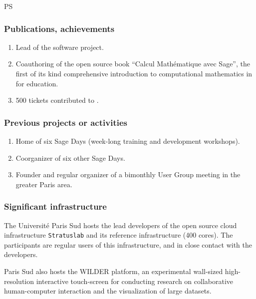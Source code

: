\begin{sitedescription}{PS}
\subsubsection*{Publications, achievements}

\begin{enumerate}
\item Lead of the \SageCombinat software project.
\item Coauthoring of the open source book ``Calcul Mathématique avec
  Sage'', the first of its kind comprehensive introduction to
  computational mathematics in \Sage for education.
\item 500 tickets contributed to \Sage.
\end{enumerate}


\subsubsection*{Previous projects or activities}

\begin{enumerate}
\item Home of six Sage Days (week-long training and development workshops).
\item Coorganizer of six other Sage Days.
\item Founder and regular organizer of a bimonthly \Sage User Group
  meeting in the greater Paris area.
\end{enumerate}

\subsubsection*{Significant infrastructure}

The Université Paris Sud hosts the lead developers of the open source
cloud infrastructure \texttt{Stratuslab} and its reference
infrastructure (400 cores). The participants are regular users
of this infrastructure, and in close contact with the developers.

Paris Sud also hosts the WILDER platform, an experimental wall-sized
high-resolution interactive touch-screen for conducting research on
collaborative human-computer interaction and the visualization of
large datasets.

\end{sitedescription}



